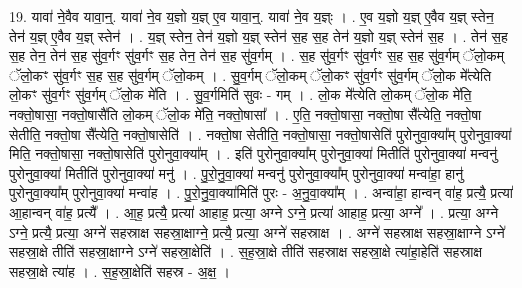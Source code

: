 \documentclass[17pt]{extarticle}
\begin{document}
19. यावा॑ ने॒वैव यावा॒न्॒. यावा॑ ने॒व य॒ज्ञो य॒ज्ञ् ए॒व यावा॒न्॒. यावा॑ ने॒व य॒ज्ञ्ः । . ए॒व य॒ज्ञो य॒ज्ञ् ए॒वैव य॒ज्ञ् स्तेन॒ तेन॑ य॒ज्ञ् ए॒वैव य॒ज्ञ् स्तेन॑ । . य॒ज्ञ् स्तेन॒ तेन॑ य॒ज्ञो य॒ज्ञ् स्तेन॑ स॒ह स॒ह तेन॑ य॒ज्ञो य॒ज्ञ् स्तेन॑ स॒ह । . तेन॑ स॒ह स॒ह तेन॒ तेन॑ स॒ह सु॑व॒र्गꣳ सु॑व॒र्गꣳ स॒ह तेन॒ तेन॑ स॒ह सु॑व॒र्गम् । . स॒ह सु॑व॒र्गꣳ सु॑व॒र्गꣳ स॒ह स॒ह सु॑व॒र्गम् ॅलो॒कम् ॅलो॒कꣳ सु॑व॒र्गꣳ स॒ह स॒ह सु॑व॒र्गम् ॅलो॒कम् । . सु॒व॒र्गम् ॅलो॒कम् ॅलो॒कꣳ सु॑व॒र्गꣳ सु॑व॒र्गम् ॅलो॒क मे᳚त्येति लो॒कꣳ सु॑व॒र्गꣳ सु॑व॒र्गम् ॅलो॒क मे॑ति । . सु॒व॒र्गमिति॑ सुवः - गम् । . लो॒क मे᳚त्येति लो॒कम् ॅलो॒क मे॑ति॒ नक्तो॒षासा॒ नक्तो॒षासै॑ति लो॒कम् ॅलो॒क मे॑ति॒ नक्तो॒षासा᳚ । . ए॒ति॒ नक्तो॒षासा॒ नक्तो॒षा सै᳚त्येति॒ नक्तो॒षा सेतीति॒ नक्तो॒षा सै᳚त्येति॒ नक्तो॒षासेति॑ । . नक्तो॒षा सेतीति॒ नक्तो॒षासा॒ नक्तो॒षासेति॑ पुरोनुवा॒क्या᳚म् पुरोनुवा॒क्या॑ मिति॒ नक्तो॒षासा॒ नक्तो॒षासेति॑ पुरोनुवा॒क्या᳚म् । . इति॑ पुरोनुवा॒क्या᳚म् पुरोनुवा॒क्या॑ मितीति॑ पुरोनुवा॒क्या॑ मन्वनु॑ पुरोनुवा॒क्या॑ मितीति॑ पुरोनुवा॒क्या॑ मनु॑ । . पु॒रो॒नु॒वा॒क्या॑ मन्वनु॑ पुरोनुवा॒क्या᳚म् पुरोनुवा॒क्या॑ मन्वा॑हा॒ हानु॑ पुरोनुवा॒क्या᳚म् पुरोनुवा॒क्या॑ मन्वा॑ह । . पु॒रो॒नु॒वा॒क्या॑मिति॑ पुरः - अ॒नु॒वा॒क्या᳚म् । . अन्वा॑हा॒ हान्वन् वा॑ह॒ प्रत्यै॒ प्रत्या॑ आ॒हान्वन् वा॑ह॒ प्रत्यै᳚ । . आ॒ह॒ प्रत्यै॒ प्रत्या॑ आहाह॒ प्रत्या॒ अग्ने ऽग्ने॒ प्रत्या॑ आहाह॒ प्रत्या॒ अग्ने᳚ । . प्रत्या॒ अग्ने ऽग्ने॒ प्रत्यै॒ प्रत्या॒ अग्ने॑ सहस्राक्ष सहस्रा॒क्षाग्ने॒ प्रत्यै॒ प्रत्या॒ अग्ने॑ सहस्राक्ष । . अग्ने॑ सहस्राक्ष सहस्रा॒क्षाग्ने ऽग्ने॑ सहस्रा॒क्षे तीति॑ सहस्रा॒क्षाग्ने ऽग्ने॑ सहस्रा॒क्षेति॑ । . स॒ह॒स्रा॒क्षे तीति॑ सहस्राक्ष सहस्रा॒क्षे त्या॑हा॒हेति॑ सहस्राक्ष सहस्रा॒क्षे त्या॑ह । . स॒ह॒स्रा॒क्षेति॑ सहस्र - अ॒क्ष॒ । \newline
\end{document}
